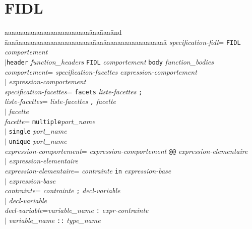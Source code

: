 \section{FIDL}
\label{annexe-grammaire-fidl}

\begin{tabbing}
aaaaaaaaaaaaaaaaaaaaaaaa\=aaa\=aaa\=and \=aaa\=aaaaaaaaaaaaaaaaaaaaaa\=aaa\=aaaaaaaaaaaaaaaaaa\=\kill
\emph{specification-fidl}\>\twocol=\> \texttt{FIDL} \emph{comportement}\\
\>$\mid$\>\texttt{header} \emph{function\_headers} \texttt{FIDL} \emph{comportement} 
\texttt{body} \emph{function\_bodies}\\

\emph{comportement}\>\twocol=\>  \emph{specification-facettes} \emph{expression-comportement} \\
    \>$\mid$\> \emph{expression-comportement} \\

\emph{specification-facettes}\>\twocol=\>  \texttt{facets} \emph{liste-facettes} \texttt{;}\\

\emph{liste-facettes}\>\twocol=\>  \emph{liste-facettes} \texttt{,} \emph{facette} \\
    \>$\mid$\> \emph{facette} \\

\emph{facette}\>\twocol=\> \texttt{multiple}\emph{port\_name} \\
    \>$\mid$\> \texttt{single} \emph{port\_name} \\
    \>$\mid$\> \texttt{unique} \emph{port\_name} \\

\emph{expression-comportement}\>\twocol=\>  \emph{expression-comportement} \verb+@@+ \emph{expression-elementaire} \\
    \>$\mid$\> \emph{expression-elementaire}\\

\emph{expression-elementaire}\>\twocol=\>  \emph{contrainte} \texttt{in} \emph{expression-base} \\
    \>$\mid$\> \emph{expression-base}\\

\emph{contrainte}\>\twocol=\> \emph{contrainte} \texttt{;} \emph{decl-variable} \\
    \>$\mid$\> \emph{decl-variable}\\

\emph{decl-variable}\>\twocol=\>\emph{variable\_name} \texttt{:} \emph{expr-contrainte} \\
    \>$\mid$\> \emph{variable\_name} \texttt{::} \emph{type\_name} \\


\end{tabbing}
